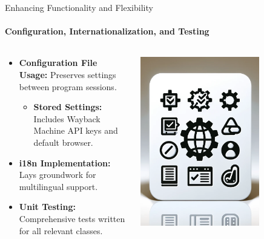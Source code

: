 \documentclass[
    ngerman,%
    authorontitle=true,
]{bfhbeamer}
\begin{document}
	\begin{frame}{Enhancing Functionality and Flexibility}
		\framesubtitle{Configuration, Internationalization, and Testing}
		\begin{columns} %
			\begin{column}{0.6\textwidth} %
				\begin{itemize}
					\item \textbf{Configuration File Usage:} Preserves settings between program sessions.
					\begin{itemize}
						\item \textbf{Stored Settings:} Includes Wayback Machine API keys and default browser.
					\end{itemize}
					\item \textbf{i18n Implementation:} Lays groundwork for multilingual support.
					\item \textbf{Unit Testing:} Comprehensive tests written for all relevant classes.
				\end{itemize}
			\end{column}
			\begin{column}{0.4\textwidth} %
				\begin{center}
					\includegraphics[width=0.7\textwidth]{pictures/final_presentation/unit_international_config.png}
				\end{center}
			\end{column}
		\end{columns} %
	\end{frame}
\end{document}
